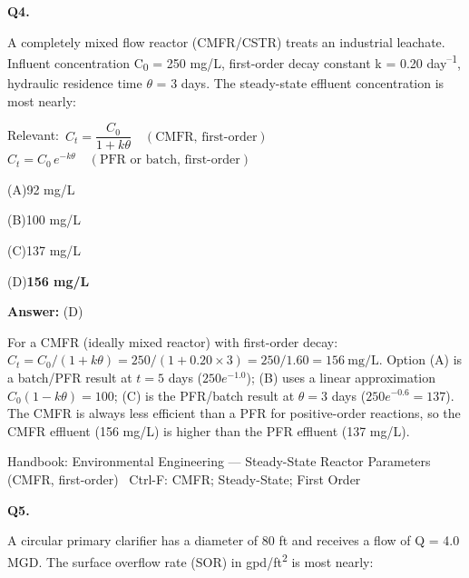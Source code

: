 \documentclass[11pt]{article}
\newcommand{\correct}[1]{\textbf{#1}\;{\color{accent}$\checkmark$}}
\newcommand{\optline}[2]{\par\noindent\hspace{1.2em}(#1)\hspace{0.6em}#2}
\begin{document}
\vspace{9pt}
\filbreak
\textbf{\color{accent}Q4.}\par\vspace{2pt}
A completely mixed flow reactor (CMFR/CSTR) treats an industrial leachate. Influent concentration C\textsubscript{0} = 250 mg/L, first-order decay constant k = 0.20 day\textsuperscript{--}\textsuperscript{1}, hydraulic residence time $\theta$ = 3 days. The steady-state effluent concentration is most nearly:\par\vspace{3pt}
{\small\color{soft}Relevant:}\ $C_t = \dfrac{C_0}{1 + k\theta}\quad (\text{CMFR, first-order})$ \quad $C_t = C_0\,e^{-k\theta}\quad (\text{PFR or batch, first-order})$\par\vspace{3pt}
\optline{A}{92 mg/L}
\optline{B}{100 mg/L}
\optline{C}{137 mg/L}
\optline{D}{\correct{156 mg/L}}
\par\vspace{3pt}
\vspace{2pt}\par\noindent\colorbox{boxbg}{\parbox{\dimexpr\linewidth-2\fboxsep\relax}{%
\vspace{2pt}\textbf{Answer:} (D)\par\vspace{2pt}
{\small For a CMFR (ideally mixed reactor) with first-order decay: $C_t = C_0/(1+k\theta) = 250/(1+0.20\times3) = 250/1.60 = 156\ \mathrm{mg/L}$. Option (A) is a batch/PFR result at $t=5$ days ($250e^{-1.0}$); (B) uses a linear approximation $C_0(1-k\theta) = 100$; (C) is the PFR/batch result at $\theta=3$ days ($250e^{-0.6}=137$). The CMFR is always less efficient than a PFR for positive-order reactions, so the CMFR effluent (156 mg/L) is higher than the PFR effluent (137 mg/L).}\par\vspace{2pt}
{\footnotesize\color{soft}Handbook: Environmental Engineering --- Steady-State Reactor Parameters (CMFR, first-order) \textbullet\ Ctrl-F: CMFR; Steady-State; First Order}\vspace{2pt}
}}
\vspace{9pt}
\filbreak
\textbf{\color{accent}Q5.}\par\vspace{2pt}
A circular primary clarifier has a diameter of 80 ft and receives a flow of Q = 4.0 MGD. The surface overflow rate (SOR) in gpd/ft\textsuperscript{2} is most nearly:\par\vspace{3pt}
\end{document}
